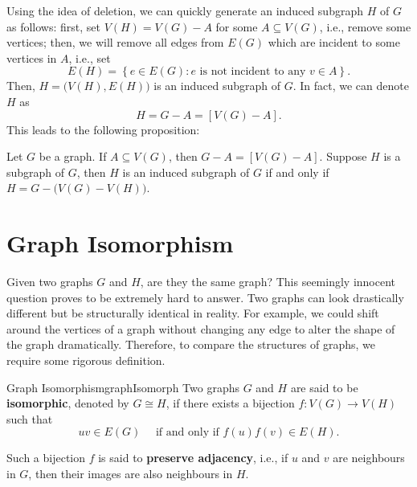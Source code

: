 \documentclass[math]{amznotes}
\theoremstyle{remark}
\begin{document}
Using the idea of deletion, we can quickly generate an induced subgraph $H$ of $G$ as follows: first, set $V(H) = V(G) - A$ for some $A \subseteq V(G)$, i.e., remove some vertices; then, we will remove all edges from $E(G)$ which are incident to some vertices in $A$, i.e., set
\begin{equation*}
    E(H) = \left\{e \in E(G) \colon e \textrm{ is not incident to any } v \in A\right\}.
\end{equation*}
Then, $H = \bigl(V(H), E(H)\bigr)$ is an induced subgraph of $G$. In fact, we can denote $H$ as
\begin{equation*}
    H = G - A = [V(G) - A].
\end{equation*}
This leads to the following proposition:
\begin{probox}{}{}
    Let $G$ be a graph. If $A \subseteq V(G)$, then $G - A = [V(G) - A]$. Suppose $H$ is a subgraph of $G$, then $H$ is an induced subgraph of $G$ if and only if $H = G - \bigl(V(G) - V(H)\bigr)$.
\end{probox}
\section{Graph Isomorphism}
Given two graphs $G$ and $H$, are they the same graph? This seemingly innocent question proves to be extremely hard to answer. Two graphs can look drastically different but be structurally identical in reality. For example, we could shift around the vertices of a graph without changing any edge to alter the shape of the graph dramatically. Therefore, to compare the structures of graphs, we require some rigorous definition.
\begin{dfnbox}{Graph Isomorphism}{graphIsomorph}
    Two graphs $G$ and $H$ are said to be {\color{red} \textbf{isomorphic}}, denoted by $G \cong H$, if there exists a bijection $f \colon V(G) \to V(H)$ such that
    \begin{equation*}
        uv \in E(G) \quad\textrm{ if and only if } f(u)f(v) \in E(H).
    \end{equation*}
\end{dfnbox}
Such a bijection $f$ is said to \textbf{preserve adjacency}, i.e., if $u$ and $v$ are neighbours in $G$, then their images are also neighbours in $H$.
\end{document}
